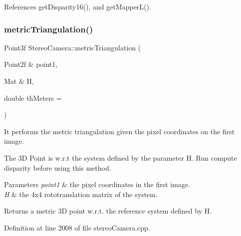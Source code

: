 References get\+Disparity16(), and get\+Mapper\+L().

\mbox{\label{classStereoCamera_a3cf53fac6336eea107a26bd5cdbbdd03}} 
\subsubsection{\texorpdfstring{metricTriangulation()}{metricTriangulation()}\hspace{0.1cm}{\footnotesize\ttfamily [2/2]}}
{\footnotesize\ttfamily Point3f Stereo\+Camera\+::metric\+Triangulation (\begin{DoxyParamCaption}\item[{Point2f \&}]{point1,  }\item[{Mat \&}]{H,  }\item[{double}]{th\+Meters = {} }\end{DoxyParamCaption})}



It performs the metric triangulation given the pixel coordinates on the first image. 

The 3D Point is w.\+r.\+t the system defined by the parameter H. Run compute disparity before using this method. 
\begin{DoxyParams}{Parameters}
{\em point1} & the pixel coordinates in the first image. \\
\hline
{\em H} & the 4x4 rototranslation matrix of the system. \\
\hline
\end{DoxyParams}
\begin{DoxyReturn}{Returns}
a metric 3D point w.\+r.\+t. the reference system defined by H. 
\end{DoxyReturn}


Definition at line 2008 of file stereo\+Camera.\+cpp.


